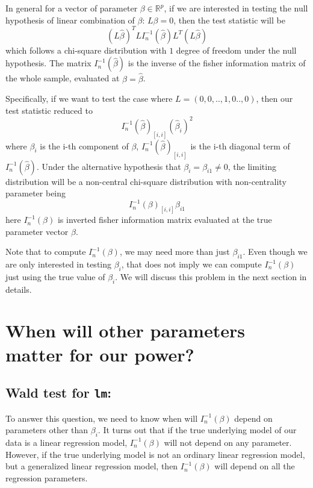 \documentclass[
]{article}
\begin{document}
In general for a vector of parameter \(\beta \in \mathbb{R}^p\), if we
are interested in testing the null hypothesis of linear combination of
\(\beta\): \(L\beta = 0\), then the test statistic will be
\[(L\hat{\beta})^T L{I_n^{-1}(\hat{\beta})L^T}(L\hat{\beta})\] which
follows a chi-square distribution with \(1\) degree of freedom under the
null hypothesis. The matrix \(I_n^{-1}(\hat{\beta})\) is the inverse of
the fisher information matrix of the whole sample, evaluated at
\(\beta = \hat{\beta}\).

Specifically, if we want to test the case where \(L =(0,0,..,1,0..,0)\),
then our test statistic reduced to
\[I_n^{-1}(\hat{\beta})_{[i,i]}(\hat{\beta}_i)^2\] where \(\beta_i\) is
the i-th component of \(\beta\), \(I_n^{-1}(\hat{{\beta}})_{[i,i]}\) is
the i-th diagonal term of \(I_n^{-1}(\hat{{\beta}})\). Under the
alternative hypothesis that \(\beta_i=\beta_{i1}\neq0\), the limiting
distribution will be a non-central chi-square distribution with
non-centrality parameter being \[I_n^{-1}(\beta)_{[i,i]}\beta_{i1}\]
here \(I_n^{-1}(\beta)\) is inverted fisher information matrix evaluated
at the true parameter vector \(\beta\).

Note that to compute \(I_n^{-1}(\beta)\), we may need more than just
\(\beta_{i1}\). Even though we are only interested in testing
\(\beta_i\), that does not imply we can compute \(I_n^{-1}(\beta)\) just
using the true value of \(\beta_i\). We will discuss this problem in the
next section in details.

\hypertarget{when-will-other-parameters-matter-for-our-power}{%
\section{When will other parameters matter for our
power?}\label{when-will-other-parameters-matter-for-our-power}}

\hypertarget{wald-test-for-lm}{%
\subsection{\texorpdfstring{Wald test for
\texttt{lm}:}{Wald test for lm:}}\label{wald-test-for-lm}}

To answer this question, we need to know when will \(I_n^{-1}(\beta)\)
depend on parameters other than \(\beta_i\). It turns out that if the
true underlying model of our data is a linear regression model,
\(I_n^{-1}(\beta)\) will not depend on any parameter. However, if the
true underlying model is not an ordinary linear regression model, but a
generalized linear regression model, then \(I_n^{-1}(\beta)\) will
depend on all the regression parameters.
\end{document}
